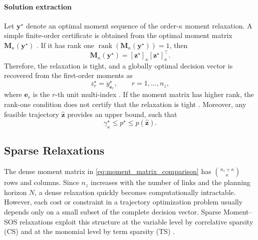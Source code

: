 \paragraph{Solution extraction}
Let \(\bm{y}^\star\) denote an optimal moment sequence of the order-\(\kappa\)
moment relaxation. A simple finite-order certificate is obtained from the
optimal moment matrix \(\bm{M}_{\kappa}(\bm{y}^\star)\)
\cite{Yang2024Semidefinite}.
If it has rank one $\operatorname{rank}\!\left(
\bm{M}_{\kappa}(\bm{y}^\star)\right)=1$, then
\begin{equation}
\bm{M}_{\kappa}(\bm{y}^\star)
=
[\bm{z}^\star]_{\kappa}
[\bm{z}^\star]_{\kappa}^{\top}.
\label{eq:2}
\end{equation}
Therefore, the relaxation is tight, and a globally optimal decision vector is
recovered from the first-order moments as
\begin{equation}
z_r^\star=y_{\bm{e}_r}^\star,
\qquad r=1,\ldots,n_z,
\label{eq:1}
\end{equation}
where \(\bm{e}_r\) is the \(r\)-th unit multi-index \cite{Yang2024Semidefinite}. 
If the moment matrix has higher rank, the rank-one condition does not certify
that the relaxation is tight \cite{Sangli2025}. Moreover, any
feasible trajectory \(\widehat{\bm{z}}\) provides an upper bound, such that
\begin{equation}
\gamma_{\kappa}^{\star}
\leq p^\star
\leq p(\widehat{\bm{z}}).
\label{eq:certified_objective_bracket}
\end{equation}

\subsection{Sparse Relaxations}
\label{subsec:sparse_relaxations}

The dense moment matrix in \eqref{eq:moment_matrix_comparison} has
\(\binom{n_z+\kappa}{\kappa}\) rows and columns. Since \(n_z\) increases with
the number of links and the planning horizon \(N\), a dense relaxation quickly
becomes computationally intractable. However, each cost or constraint in a
trajectory optimization problem usually depends only on a small subset of the
complete decision vector. Sparse Moment--SOS relaxations exploit this structure
at the variable level by correlative sparsity (CS) and at the monomial level by
term sparsity (TS) \cite{Kang_2025Global,Kang_2026Fast,Sangli2025}.

